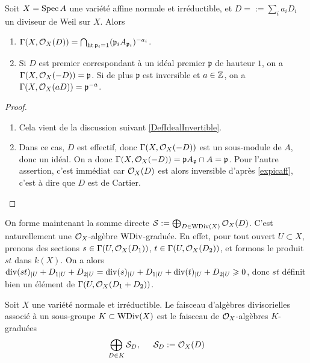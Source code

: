 \begin{prop}\label{divaff}
Soit $X=\operatorname{Spec} A$ une variété affine normale et irréductible, et $D=:=\sum_i a_iD_i$ un diviseur de Weil sur $X$. Alors
\begin{enumerate}
\item $\Gamma(X,\mathcal{O}_X(D))=\bigcap_{\operatorname{ht} \mathfrak{p}_i=1}(\mathfrak{p}_iA_{\mathfrak{p}_i})^{-a_i}$.
\item Si $D$ est premier correspondant à un idéal premier $\mathfrak{p}$ de hauteur $1$, on a $\Gamma(X,\mathcal{O}_X(-D))=\mathfrak{p}$. Si de plus $\mathfrak{p}$ est inversible et $a\in \mathbb{Z}$, on a $\Gamma(X,\mathcal{O}_X(aD))=\mathfrak{p}^{-a}$.
\end{enumerate}
\end{prop}
\begin{proof}
\begin{enumerate}
\item Cela vient de la discussion suivant \ref{DefIdealInvertible}.
\item Dans ce cas, $D$ est effectif, donc $\Gamma(X,\mathcal{O}_X(-D))$ est un sous-module de $A$, donc un idéal. On a donc $\Gamma(X,\mathcal{O}_X(-D))=\mathfrak{p}A_\mathfrak{p}\cap A=\mathfrak{p}$. Pour l'autre assertion, c'est immédiat car $\mathcal{O}_X(D)$ est alors inversible d'après \ref{expicaff}, c'est à dire que $D$ est de Cartier.
\end{enumerate}
\end{proof}

On forme maintenant la somme directe $\mathcal{S}:=\bigoplus_{D\in \operatorname{WDiv}(X)}\mathcal{O}_X(D)$. C'est naturellement une $\mathcal{O}_X$-algèbre $\operatorname{WDiv}$-graduée. En effet, pour tout ouvert $U\subset X$, prenons des sections $s\in\Gamma(U,\mathcal{O}_X(D_1))$, $t\in \Gamma(U,\mathcal{O}_X(D_2))$, et formons le produit $st$ dans $k(X)$. On a alors $\operatorname{div}(st)_{|U}+D_{1|U}+D_{2|U}=\operatorname{div}(s)_{|U}+D_{1|U}+\operatorname{div}(t)_{|U}+D_{2|U}\geqslant 0$, donc $st$ définit bien un élément de $\Gamma(U,\mathcal{O}_X(D_1+D_2))$.

\begin{defn}
Soit $X$ une variété normale et irréductible. Le faisceau d'algèbres divisorielles associé à un sous-groupe $K\subset \operatorname{WDiv}(X)$ est le faisceau de $\mathcal{O}_X$-algèbres $K$-graduées $$\bigoplus_{D\in K}\mathcal{S}_D,\,\,\,\,\,\,\,\,\, \mathcal{S}_D:=\mathcal{O}_X(D)$$ 
\end{defn}



